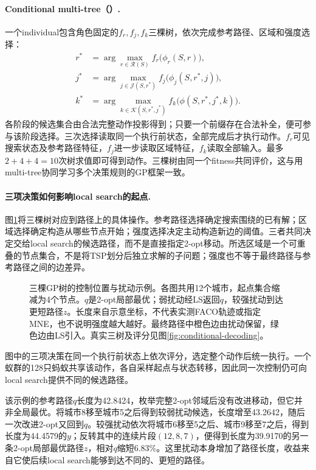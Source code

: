 \paragraph{Conditional multi-tree（\CT{}）.}
一个individual包含角色固定的$f_r,f_j,f_k$三棵树，依次完成参考路径、区域和强度选择：
\begin{align}
 r^*&=\arg\max_{r\in\mathcal R(S)} f_r\bigl(\phi_r(S,r)\bigr),\\
 j^*&=\arg\max_{j\in\mathcal J(S,r^*)} f_j\bigl(\phi_j(S,r^*,j)\bigr),\\
 k^*&=\arg\max_{k\in\mathcal K(S,r^*,j^*)} f_k\bigl(\phi(S,r^*,j^*,k)\bigr).
\end{align}
各阶段的候选集合由合法完整动作投影得到；只要一个前缀存在合法补全，便可参与该阶段选择。三次选择读取同一个执行前状态，全部完成后才执行动作。$f_r$可见搜索状态及参考路径特征，$f_j$进一步读取区域特征，$f_k$读取全部输入。最多$2+4+4=10$次树求值即可得到动作。三棵树由同一个fitness共同评价，这与用multi-tree协同学习多个决策规则的GP框架一致\cite{zhang2018multitree,sun2024multicloud}。

\paragraph{三项决策如何影响local search的起点.}
图\ref{fig:control-mechanism}将三棵树对应到路径上的具体操作。参考路径选择确定搜索围绕的已有解；区域选择确定构造从哪些节点开始；强度选择决定主动构造新边的阈值。三者共同决定交给local search的候选路径，而不是直接指定2-opt移动。所选区域是一个可重叠的节点集合，不是将TSP划分后独立求解的子问题；强度也不等于最终路径与参考路径之间的边差异。

\begin{figure}[p]
\centering

\caption{三棵GP树的控制位置与扰动示例。各图共用12个城市，起点集合缩减为4个节点。$q$是2-opt局部最优；弱扰动经LS返回$q$，较强扰动到达更短路径$z$。长度来自示意坐标，不代表实测FACO轨迹或指定MNE，也不说明强度越大越好。最终路径中橙色边由扰动保留，绿色边由LS引入。真实三树及评分见图\ref{fig:conditional-decoding}。}
\label{fig:control-mechanism}
\end{figure}

图中的三项决策在同一个执行前状态上依次评分，选定整个动作后统一执行。一个蚁群的128只蚂蚁共享该动作，各自采样起点与状态转移，因此同一次控制仍可向local search提供不同的候选路径。

该示例的参考路径$q$长度为42.8424，枚举完整2-opt邻域后没有改进移动，但它并非全局最优。将城市8移至城市5之后得到较弱扰动候选，长度增至43.2642，随后一次改进2-opt又回到$q$。较强扰动依次将城市6移至5之后、城市9移至7之后，得到长度为44.4579的$y$；反转其中的连续片段$(12,8,7)$，便得到长度为39.9170的另一条2-opt局部最优路径$z$，相对$q$缩短6.83\%。这里扰动本身增加了路径长度，收益来自它使后续local search能够到达不同的、更短的路径。

